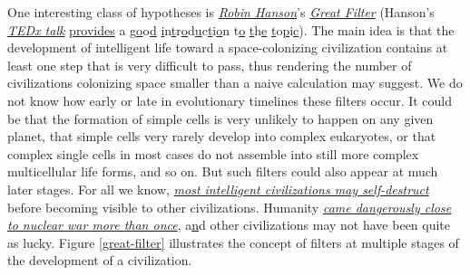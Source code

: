 \documentclass[]{article}
\begin{document}
One interesting class of hypotheses is
\href{https://en.wikipedia.org/wiki/Robin_Hanson}{\emph{Robin Hanson}}'s
\href{https://en.wikipedia.org/wiki/Great_Filter}{\emph{Great Filter}}
(Hanson's \href{https://www.youtube.com/watch?v=aspMV6ERqpo}{\emph{TEDx
talk}} \href{https://www.youtube.com/watch?v=aspMV6ERqpo}{provides} a
g\href{https://www.youtube.com/watch?v=aspMV6ERqpo}{o}o\href{https://www.youtube.com/watch?v=aspMV6ERqpo}{d}
\href{https://www.youtube.com/watch?v=aspMV6ERqpo}{i}n\href{https://www.youtube.com/watch?v=aspMV6ERqpo}{t}r\href{https://www.youtube.com/watch?v=aspMV6ERqpo}{o}d\href{https://www.youtube.com/watch?v=aspMV6ERqpo}{u}c\href{https://www.youtube.com/watch?v=aspMV6ERqpo}{t}i\href{https://www.youtube.com/watch?v=aspMV6ERqpo}{o}n
t\href{https://www.youtube.com/watch?v=aspMV6ERqpo}{o}
\href{https://www.youtube.com/watch?v=aspMV6ERqpo}{t}h\href{https://www.youtube.com/watch?v=aspMV6ERqpo}{e}
\href{https://www.youtube.com/watch?v=aspMV6ERqpo}{t}o\href{https://www.youtube.com/watch?v=aspMV6ERqpo}{p}i\href{https://www.youtube.com/watch?v=aspMV6ERqpo}{c}).
The main idea is that the development of intelligent life toward a
space-colonizing civilization contains at least one step that is very
difficult to pass, thus rendering the number of civilizations colonizing
space smaller than a naive calculation may suggest. We do not know how
early or late in evolutionary timelines these filters occur. It could be
that the formation of simple cells is very unlikely to happen on any
given planet, that simple cells very rarely develop into complex
eukaryotes, or that complex single cells in most cases do not assemble
into still more complex multicellular life forms, and so on. But such
filters could also appear at much later stages. For all we know,
\href{https://en.wikipedia.org/wiki/Fermi_paradox\#It_is_the_nature_of_intelligent_life_to_destroy_itself}{\emph{most
intelligent civilizations may self-destruct}} before becoming visible to
other civilizations. Humanity
\href{https://en.wikipedia.org/wiki/List_of_nuclear_close_calls}{\emph{came
dangerously close to nuclear war more than once}},
a\href{https://en.wikipedia.org/wiki/List_of_nuclear_close_calls}{n}d
other civilizations may not have been quite as lucky. Figure
\ref{great-filter} illustrates the concept of filters
at multiple stages of the development of a civilization.
\end{document}
